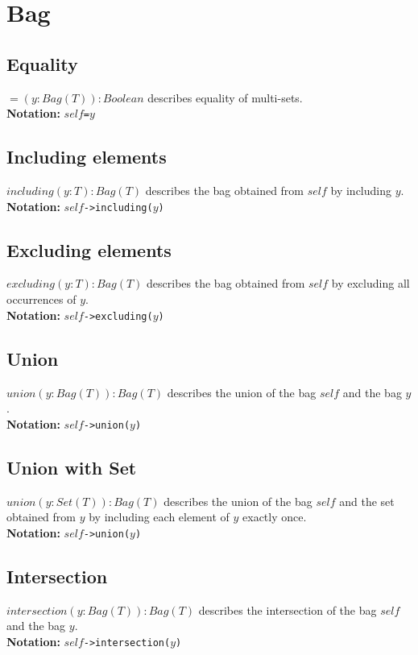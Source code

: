 \section{Bag}
\subsection{Equality}
$=(y:\mathit{Bag}(T)):\mathit{Boolean}$ describes equality of
multi-sets.\\
  {\bf Notation:} $\mathit{self}$\verb+=+$y$
\subsection{Including elements}
$\mathit{including}(y:T):\mathit{Bag}(T)$ describes the bag
obtained from
  $\mathit{self}$ by including $y$.\\
  {\bf Notation:} $\mathit{self}$\verb+->including(+$y$\verb+)+
\subsection{Excluding elements}
$\mathit{excluding}(y:T):\mathit{Bag}(T)$ describes the bag obtained from
  $\mathit{self}$ by excluding all occurrences of $y$.\\
  {\bf Notation:} $\mathit{self}$\verb+->excluding(+$y$\verb+)+
\subsection{Union}
$\mathit{union}(y:\mathit{Bag}(T)):\mathit{Bag}(T)$ describes the union of the
bag
  $\mathit{self}$ and the bag $y$.\\
  {\bf Notation:} $\mathit{self}$\verb+->union(+$y$\verb+)+
\subsection{Union with Set}
$\mathit{union}(y:\mathit{Set}(T)):\mathit{Bag}(T)$ describes the union of the
bag
  $\mathit{self}$ and the set obtained from $y$ by including each element of
  $y$ exactly once.\\
  {\bf Notation:} $\mathit{self}$\verb+->union(+$y$\verb+)+
\subsection{Intersection}
$\mathit{intersection}(y:\mathit{Bag}(T)):\mathit{Bag}(T)$ describes the
intersection
  of the bag $\mathit{self}$ and the bag $y$.\\
  {\bf Notation:} $\mathit{self}$\verb+->intersection(+$y$\verb+)+

